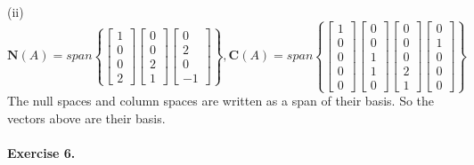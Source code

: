 \documentclass{article}
\begin{document}
  (ii)\[
    \mathbf{N}(A)=span
    \left\{
      \begin{bmatrix}
      1\\0\\0\\2
      \end{bmatrix}
      \begin{bmatrix}
        0\\0\\2\\1
        \end{bmatrix}   
        \begin{bmatrix}
          0\\2\\0\\-1
          \end{bmatrix} 
      \right\},
      \mathbf{C}(A)=span
      \left\{
        \begin{bmatrix}
        1\\0\\0\\0\\0
        \end{bmatrix}
        \begin{bmatrix}
        0\\0\\1\\1\\0
          \end{bmatrix}   
          \begin{bmatrix}
        0\\0\\0\\2\\1
            \end{bmatrix} 
          \begin{bmatrix}
              0\\1\\0\\0\\0
        \end{bmatrix} 
        \right\}
  \]
  The null spaces and column spaces are written as a span of their basis. So the vectors above are their basis.
  \paragraph{Exercise 6.}
\end{document}
